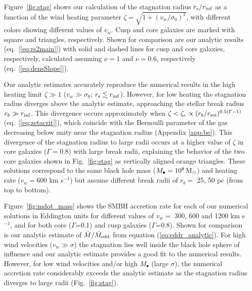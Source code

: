 \documentclass[usenatbib,fleqn]{mn2e}
\newcommand{\Mbh}[1][]{M_{\bullet#1}}
\newcommand{\vwO}{v_{w}}
\newcommand{\densSlope}{\nu}
\begin{document}
Figure~\ref{fig:stag} shows our calculation of the stagnation radius
$r_{\rm s}/r_{\rm inf}$ as a function of the wind heating parameter
$\zeta = \sqrt{1+(v_w/\sigma_0)^{2}}$, with different colors
showing different values of $v_{w}$.  Cusp and core galaxies are
marked with square and triangles, respectively.  Shown for comparison
are our analytic results (eq.~[\ref{eq:rs2main}]) with solid and
dashed lines for cusp and core galaxies, respectively, calculated
assuming $\densSlope = 1$ and $\densSlope= 0.6$, respectively
(eq.~[\ref{eq:densSlope}]).

Our analytic estimates accurately reproduce the numerical results in
the high heating limit $\zeta \gg 1$ ($v_w \gg \sigma_0$; $r_{\rm s}
\lesssim r_{\rm inf}$).  However, for low heating the
stagnation radius diverges above the analytic estimate, approaching
the stellar break radius $r_b \gg r_{\rm inf}$.  This divergence
occurs approximately when $\zeta < \zeta_c \propto (r_b/r_{\rm
  soi})^{0.5(\Gamma-1)}$ (eq.~[\ref{eq:zetacrit}]), which coincide with the Bernoulli parameter of the gas decreasing below unity near the stagnation radius (Appendix \ref{app:be}).  This divergence of the stagnation radius to large radii occurs at a higher value of $\zeta$ in core galaxies ($\Gamma = 0.8$) with large break radii, explaining the behavior of the two core galaxies shown in Fig.~\ref{fig:stag} as vertically aligned orange triangles.  These solutions correspond to the same black hole mass
($\Mbh = 10^8 \Msun$) and heating rate ($v_w = 600$ km s$^{-1}$) but assume different break radii of $r_{b} =$ 25, 50 pc (from top to
bottom). 

Figure~\ref{fig:mdot_mass} shows the SMBH accretion rate for each of
our numerical solutions in Eddington units for different values of
$\vwO =$ 300, 600 and 1200 km s$^{-1}$, and for both core
($\Gamma$=0.1) and cusp galaxies ($\Gamma$=0.8).  Shown for comparison
is our analytic estimate of $\dot{M}/\dot{M}_{\rm edd}$ from equation
(\ref{eq:eddr_analytic}).  For high wind velocities ($v_{w} \gg
\sigma$) the stagnation lies well inside the black hole sphere of
influence and our analytic estimate provides a good fit to the
numerical results.  However, for low wind velocities and/or high
$M_{\bullet}$ (large $\sigma$), the numerical accretion rate
considerably exceeds the analytic estimate as the stagnation radius
diverges to large radii (Fig.~\ref{fig:stag}).
\end{document}
